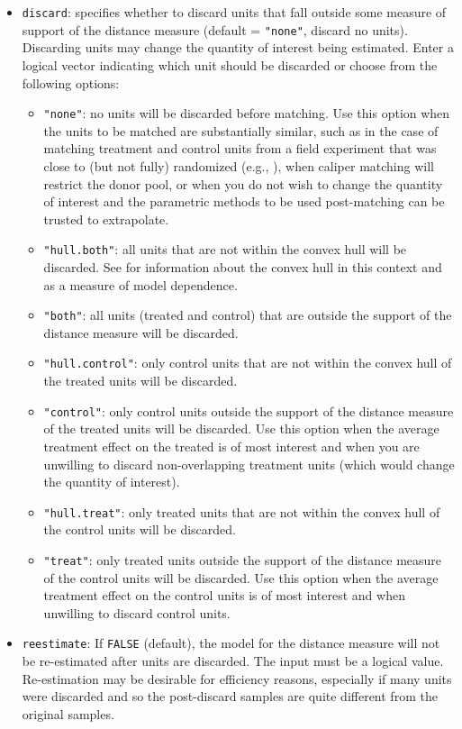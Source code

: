 \begin{itemize}
\item \texttt{discard}: specifies whether to discard units that fall
  outside some measure of support of the distance measure (default =
  \texttt{"none"}, discard no units).  Discarding units may change the
  quantity of interest being estimated. Enter a logical vector
  indicating which unit should be discarded or choose from the
  following options:
  \begin{itemize}
  \item \texttt{"none"}: no units will be discarded before matching.
    Use this option when the units to be matched are substantially
    similar, such as in the case of matching treatment and control
    units from a field experiment that was close to (but not fully)
    randomized (e.g., \citealt{Imai05}), when caliper matching will
    restrict the donor pool, or when you do not wish to change the
    quantity of interest and the parametric methods to be used
    post-matching can be trusted to extrapolate.
  \item \texttt{"hull.both"}: all units that are not within the convex
    hull will be discarded.  See \citet{KinZen06,KinZen07} for
    information about the convex hull in this context and as a measure
    of model dependence.
  \item \texttt{"both"}: all units (treated and control) that are
    outside the support of the distance measure will be discarded.
  \item \texttt{"hull.control"}: only control units that are not
    within the convex hull of the treated units will be discarded.  
  \item \texttt{"control"}: only control units outside the support of
    the distance measure of the treated units will be discarded.  Use
    this option when the average treatment effect on the treated is of
    most interest and when you are unwilling to discard
    non-overlapping treatment units (which would change the quantity
    of interest).
  \item \texttt{"hull.treat"}: only treated units that are not within
    the convex hull of the control units will be discarded. 
  \item \texttt{"treat"}: only treated units outside the support of
    the distance measure of the control units will be discarded.  Use
    this option when the average treatment effect on the control units
    is of most interest and when unwilling to discard control units.
  \end{itemize}
  
\item \texttt{reestimate}: If {\tt FALSE} (default), the model for the
  distance measure will not be re-estimated after units are discarded.
  The input must be a logical value.  Re-estimation may be desirable
  for efficiency reasons, especially if many units were discarded and
  so the post-discard samples are quite different from the original
  samples.
  
\end{itemize}

